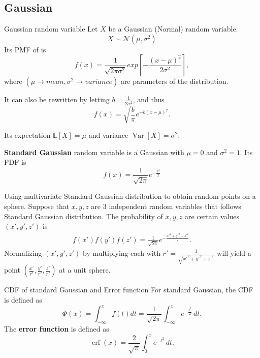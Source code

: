 \documentclass[11pt,a4paper,fleqn]{article}
\numberwithin{equation}{section}
\DeclareMathOperator\Var{\mathrm{Var}}
\DeclareMathOperator\Erf{\ensuremath{\text{erf}}}
\begin{document}
\subsection{Gaussian}

\begin{fact}{Gaussian random variable}{}
    Let $X$ be a Gaussian (Normal) random variable.
    \begin{equation*}
        X \sim \mathcal{N}(\mu,\sigma^2)
    \end{equation*}
    Its PMF of is
    \begin{equation*}
        f(x)=\frac{1}{\sqrt{2\pi\sigma^2}}exp\left[-\frac{(x-\mu)^2}{2\sigma^2}\right],
    \end{equation*}
    where $(\mu\rightarrow mean,\sigma^2\rightarrow variance)$ are parameters of the distribution.

    It can also be rewritten by letting $b=\frac{1}{2\sigma^2}$, and thus
    \begin{equation*}
        f(x)=\sqrt{\frac{b}{\pi}}e^{-b(x-\mu)^2}.
    \end{equation*}

    Its expectation $\mathbb{E}[X]=\mu$ and variance $\Var[X]=\sigma^2$.

    \textbf{Standard Gaussian} random variable is a Gaussian with $\mu=0$ and $\sigma^2=1$. Its PDF is
    \begin{equation*}
        f(x)=\frac{1}{\sqrt{2\pi}}e^{-\frac{x^2}{2}}
    \end{equation*}
\end{fact}

\begin{exec}
    Using multivariate Standard Gaussian distribution to obtain random points on a sphere.
    \tcblower
    Suppose that $x,y,z$ are 3 independent random variables that follows Standard Gaussian distribution.
    The probability of $x,y,z$ are certain values $(x',y',z')$ is
    \begin{align*}
        f(x')f(y')f(z')=\frac{1}{\sqrt{2\pi}}e^{-\frac{x'^2+y'^2+z'^2}{2}}.
    \end{align*}
    Normalizing $(x',y',z')$ by multiplying each with $r'=\frac{1}{\sqrt{x'^2+y'^2+z'^2}}$ will yield a point $(\frac{x'}{r'},\frac{y'}{r'},\frac{z'}{r'})$ at a unit sphere.
\end{exec}

\begin{fact}{CDF of standard Gaussian and Error function}{}
    For standard Gaussian, the CDF is defined as
    \begin{equation*}
        \Phi(x)=\int_{-\infty}^{x}f(t)dt=\frac{1}{\sqrt{2\pi}}\int_{-\infty}^{x} e^{-\frac{t^2}{2}}\,dt.
    \end{equation*}
    The \textbf{error function} is defined as
    \begin{equation*}
        \Erf (x)=\frac{2}{\sqrt{\pi}}\int_{0}^{x}e^{-t^2}\,dt.
    \end{equation*}
\end{fact}
\end{document}
